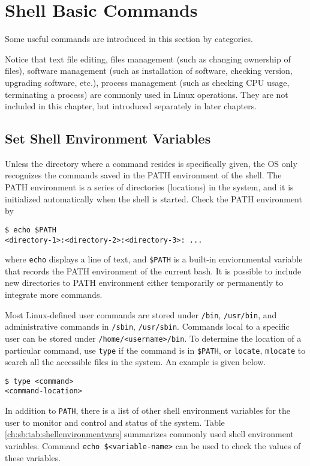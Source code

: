 \section{Shell Basic Commands}

Some useful commands are introduced in this section by categories.

Notice that text file editing, files management (such as changing ownership of files), software management (such as installation of software, checking version, upgrading software, etc.), process management (such as checking CPU usage, terminating a process) are commonly used in Linux operations. They are not included in this chapter, but introduced separately in later chapters.

\subsection{Set Shell Environment Variables}\label{ch:sb:subsec:shellenvvar}

Unless the directory where a command resides is specifically given, the OS only recognizes the commands saved in the PATH environment of the shell. The PATH environment is a series of directories (locations) in the system, and it is initialized automatically when the shell is started. Check the PATH environment by
\begin{lstlisting}
$ echo $PATH
<directory-1>:<directory-2>:<directory-3>: ...
\end{lstlisting}
where \verb|echo| displays a line of text, and \verb|$PATH| is a built-in enviornmental variable that records the PATH environment of the current bash. It is possible to include new directories to PATH environment either temporarily or permanently to integrate more commands.

Most Linux-defined user commands are stored under \verb|/bin|, \verb|/usr/bin|, and administrative commands in \verb|/sbin|, \verb|/usr/sbin|. Commands local to a specific user can be stored under \verb|/home/<username>/bin|. To determine the location of a particular command, use \verb|type| if the command is in \verb|$PATH|, or \verb|locate|, \verb|mlocate| to search all the accessible files in the system. An example is given below.
\begin{lstlisting}
$ type <command>
<command-location>
\end{lstlisting}

In addition to \verb|PATH|, there is a list of other shell environment variables for the user to monitor and control and status of the system. Table \ref{ch:sb:tab:shellenvironmentvars} summarizes commonly used shell environment variables. Command \verb|echo $<variable-name>| can be used to check the values of these variables.

